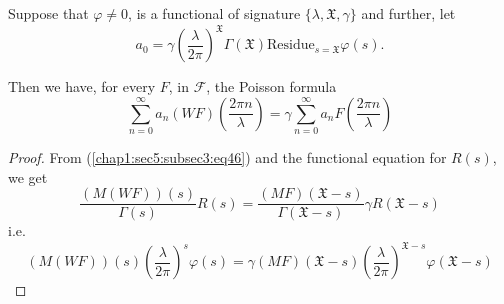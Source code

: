 \begin{theorem*}
  Suppose that $\varphi \neq 0$, is a functional of signature $\{\lambda,
  \mathfrak{X}, \gamma\}$ and further, let
  \begin{equation*}
    a_{0}=\gamma\left(\frac{\lambda}{2\pi}\right)^{\mathfrak{X}}
    \Gamma(\mathfrak{X})\text{Residue}_{s=\mathfrak{X}}\varphi(s).
  \end{equation*}

  Then we have, for every $F$, in $\mathscr{F}$, the Poisson formula
  \begin{equation*}
    \sum\limits_{n=0}^{\infty}a_{n}(WF)\left(\frac{2\pi
      n}{\lambda}\right)=\gamma\sum\limits_{n=0}^{\infty}a_{n}F\left(\frac{2\pi
      n}{\lambda}\right) 
  \end{equation*}
\end{theorem*}

\begin{proof}
  From (\ref{chap1:sec5:subsec3:eq46}) and the functional equation for $R(s)$, we get 
  \begin{equation*}
    \frac{(M(WF))(s)}{\Gamma(s)}R(s)=\frac{(MF) (\mathfrak{X}-s)}
         {\Gamma(\mathfrak{X}-s)}\gamma R{(\mathfrak{X}-s)}
  \end{equation*}
  i.e.\pageoriginale
  \begin{equation*}
    (M(WF))(s)\left(\frac{\lambda}{2\pi}\right)^{s}\varphi(s)
    =\gamma(MF)(\mathfrak{X}-s)\left(\frac{\lambda}{2\pi}
    \right)^{\mathfrak{X}-s}\varphi(\mathfrak{X}-s)
    \tag{48}\label{chap1:sec5:subsec3:eq48} 
  \end{equation*}
\end{proof}


